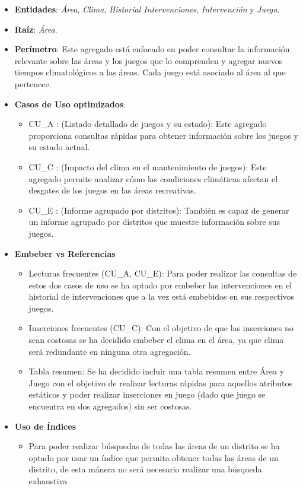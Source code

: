 \documentclass[]{article}
\begin{document}
\begin{itemize}
    \item \textbf{Entidades}: \textit{Área}, \textit{Clima}, \textit{Historial Intervenciones}, \textit{Intervención} y \textit{Juego}.
    \item \textbf{Raíz}: \textit{Área}.
    \item \textbf{Perímetro}: Este agregado está enfocado en poder consultar la información relevante sobre las áreas y los juegos que lo comprenden y agregar nuevos tiempos climatológicos a las áreas. Cada juego está asociado al área al que pertenece.
    \item \textbf{Casos de Uso optimizados}:
    \begin{itemize}
        \item CU\_A : (Listado detallado de juegos y su estado): Este agregado proporciona consultas rápidas para obtener información sobre los juegos y su estado actual. 
        \item CU\_C : (Impacto del clima en el mantenimiento de juegos): Este agregado permite analizar cómo las condiciones climáticas afectan el desgates de los juegos en las áreas recreativas.
        \item CU\_E : (Informe agrupado por distritos): También es capaz de generar un informe agrupado por distritos que muestre información sobre sus juegos. 
    \end{itemize}
    \item \textbf{Embeber vs Referencias}
    \begin{itemize}
        \item Lecturas frecuentes (CU\_A, CU\_E): Para poder realizar las consultas de estos dos casos de uso se ha optado por embeber las intervenciones en el historial de intervenciones que a la vez está embebidos en sus respectivos juegos.
        \item Inserciones frecuentes (CU\_C): Con el objetivo de que las inserciones no sean costosas se ha decidido embeber el clima en el área, ya que clima será redundante en ninguna otra agregación.
        \item Tabla resumen: Se ha decidido incluir una tabla resumen entre Área y Juego con el objetivo de realizar lecturas rápidas para aquellos atributos estáticos y poder realizar inserciones en juego (dado que juego se encuentra en dos agregados) sin ser costosas.
    \end{itemize}
    \item \textbf{Uso de Índices}
    \begin{itemize}
        \item Para poder realizar búsquedas de todas las áreas de un distrito se ha optado por usar un índice que permita obtener todas las áreas de un distrito, de esta mánera no será necesario realizar una búsqueda exhaustiva
    \end{itemize}
\end{itemize}
\end{document}
